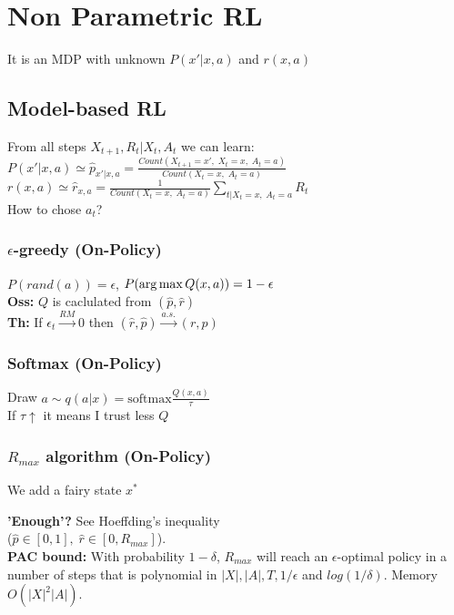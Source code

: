 \section{Non Parametric RL}
It is an MDP with unknown $P(x'\vert x,a)$ and $r(x,a)$

\subsection{Model-based RL}
From all steps $X_{t+1},R_t \vert X_{t}, A_{t}$ we can learn:\\
$P(x'\vert x,a)\simeq \hat{p}_{x'\vert x, a} = \frac{Count(X_{t+1}=x',\; X_t=x,\;A_t =a)}{Count(X_t=x,\; A_t = a)}$\\
$r(x,a)\simeq \hat{r}_{x,a}= \frac{1}{Count(X_t=x,\; A_t=a)}\sum_{t|X_t=x,\; A_t=a}R_t$\\
How to chose $a_t$?

\subsubsection{$\epsilon$-greedy (On-Policy)}
$P(rand(a)) = \epsilon$, $P(\operatorname*{arg\,max} Q(x,a)) = 1 - \epsilon$\\
\textbf{Oss:} $Q$ is caclulated from $(\hat{p}, \hat{r})$\\
\textbf{Th:} If $\epsilon_t\xrightarrow{RM}0$ then $(\hat{r},\hat{p})\xrightarrow{a.s.}(r,p)$

\subsubsection{Softmax (On-Policy)}
Draw $a \sim q(a\vert x) = \text{softmax}\frac{Q(x,a)}{\tau}$\\
If $\tau \uparrow $ it means I trust less $Q$

\subsubsection{$R_{max}$ algorithm (On-Policy)}
We add a fairy state $x^*$\\
\begin{algorithm}[H]
\end{algorithm}
\textbf{'Enough'?} See Hoeffding's inequality \\
($\hat{p}\in [0, 1],\; \hat{r}\in [0, R_{max}]$).\\
\textbf{PAC bound:} With probability $1-\delta$, $R_{max}$ will reach an $\epsilon$-optimal policy in a number of steps that is polynomial in $|X|, |A|, T, 1/\epsilon$ and $log(1/\delta)$. Memory $O(|X|^2|A|)$. 

